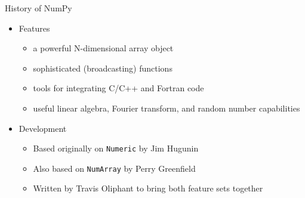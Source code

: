 \begin{frame}
  History of NumPy
  \begin{itemize}
  \item Features
    \begin{itemize}
      \item a powerful N-dimensional array object
      \item sophisticated (broadcasting) functions
      \item tools for integrating C/C++ and Fortran code
      \item useful linear algebra, Fourier transform, and random number capabilities
    \end{itemize}
  \item Development
    \begin{itemize}
    \item Based originally on {\tt Numeric} by Jim Hugunin
    \item Also based on {\tt NumArray} by Perry Greenfield
    \item Written by Travis Oliphant to bring both feature sets together
    \end{itemize}
  \end{itemize}
\end{frame}

